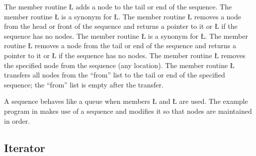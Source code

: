 \documentclass[openright,twoside]{report}
\begin{document}
The member routine \LGinlinetrue\LGbegin\lgrinde\L{}\endlgrinde\LGend{} adds a node to the tail or end of the sequence.
The member routine \LGinlinetrue\LGbegin\lgrinde\L{}\endlgrinde\LGend{} is a synonym for \LGinlinetrue\LGbegin\lgrinde\L{}\endlgrinde\LGend{}.
The member routine \LGinlinetrue\LGbegin\lgrinde\L{}\endlgrinde\LGend{} removes a node from the head or front of the sequence and returns a pointer to it or \LGinlinetrue\LGbegin\lgrinde\L{}\endlgrinde\LGend{} if the sequence has no nodes.
The member routine \LGinlinetrue\LGbegin\lgrinde\L{}\endlgrinde\LGend{} is a synonym for \LGinlinetrue\LGbegin\lgrinde\L{}\endlgrinde\LGend{}.
The member routine \LGinlinetrue\LGbegin\lgrinde\L{}\endlgrinde\LGend{} removes a node from the tail or end of the sequence and returns a pointer to it or \LGinlinetrue\LGbegin\lgrinde\L{}\endlgrinde\LGend{} if the sequence has no nodes.
The member routine \LGinlinetrue\LGbegin\lgrinde\L{}\endlgrinde\LGend{} removes the specified node from the sequence (any location).
The member routine \LGinlinetrue\LGbegin\lgrinde\L{}\endlgrinde\LGend{} transfers all nodes from the ``from'' list to the tail or end of the specified sequence;
the ``from'' list is empty after the transfer.

A sequence behaves like a queue when members \LGinlinetrue\LGbegin\lgrinde\L{}\endlgrinde\LGend{} and \LGinlinetrue\LGbegin\lgrinde\L{}\endlgrinde\LGend{} are used.
The example program in  makes use of a sequence and modifies it so that nodes are maintained in order.


\subsection{Iterator}
\end{document}
